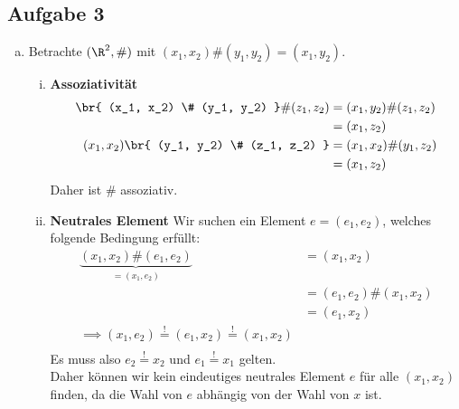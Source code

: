 \subsection*{Aufgabe 3} %
\label{sub:aufgabe_3}
\begin{enumerate}[a)]
  \item Betrachte $ (\R^2, \#) $ mit $ (x_1, x_2)\# (y_1, y_2) = (x_1, y_2) $.
  \begin{enumerate}[i)]
    \item \textbf{Assoziativität}
      \begin{align*}
        \br{ (x_1, x_2) \# (y_1, y_2) } \# (z_1, z_2) &= (x_1, y_2) \# (z_1, z_2) \\
                                                      &= (x_1, z_2) \\
        (x_1, x_2) \br{ (y_1, y_2) \# (z_1, z_2) } &= (x_1, x_2) \# (y_1, z_2) \\
                                                   &= (x_1, z_2) \\
      \end{align*}
      Daher ist $\#$ assoziativ.
    \item \textbf{Neutrales Element}
      Wir suchen ein Element $e = (e_1, e_2)$, welches folgende Bedingung erfüllt:
      \begin{align*}
        \underbrace{(x_1,x_2)\#(e_1, e_2)}_{=(x_1, e_2)} &= (x_1, x_2) \\
                              &= (e_1, e_2) \# (x_1, x_2) \\
                              &= (e_1, x_2) \\
                \implies (x_1, e_2) \overset{!}{=} (e_1, x_2) \overset{!}{=} (x_1, x_2) \\
      \end{align*}
      Es muss also $e_2 \overset{!}{=} x_2$ und $e_1 \overset{!}{=} x_1$ gelten. \\
      Daher können wir kein eindeutiges neutrales Element $e$ für alle $(x_1, x_2)$ finden, da die Wahl von $e$ abhängig von der Wahl von $x$ ist.


\end{enumerate}
\end{enumerate}
